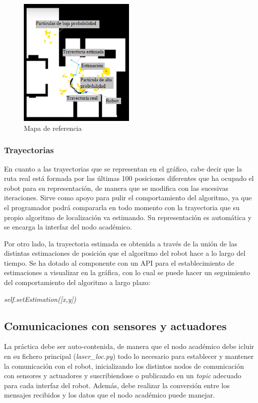 \begin{figure}[H]
	\begin{center}
		\includegraphics[width=0.5\textwidth]{figures/mapareferencia.png}
		\caption{Mapa de referencia}
		\label{fig.mapareferencia}
		\end{center}
\end{figure}

\subsubsection{Trayectorias}
En cuanto a las trayectorias que se representan en el gráfico, cabe decir que la ruta real está formada por las últimas 100 posiciones diferentes que ha ocupado el robot para su representación, de manera que se modifica con las sucesivas iteraciones. Sirve como apoyo para pulir el comportamiento del algoritmo, ya que el programador podrá compararla en todo momento con la trayectoria que su propio algoritmo de localización va estimando. Su representación es automática y se encarga la interfaz del nodo académico.

Por otro lado, la trayectoria estimada es obtenida a través de la unión de las distintas estimaciones de posición que el algoritmo del robot hace a lo largo del tiempo. Se ha dotado al componente con un API para el establecimiento de estimaciones a visualizar en la gráfica, con lo cual se puede hacer un seguimiento del comportamiento del algoritmo a largo plazo:

\hspace{0.32\linewidth} \textit{self.setEstimation([x,y])}
 
\subsection{Comunicaciones con sensores y actuadores}
La práctica debe ser auto-contenida, de manera que el nodo académico debe icluir en su fichero principal (\textit{laser\_loc.py}) todo lo necesario para establecer y mantener la comunicación con el robot, inicializando los distintos nodos de comunicación con sensores y actuadores y suscribiendose o publicando en un \textit{topic} adecuado para cada interfaz del robot. Además, debe realizar la conversión entre los mensajes recibidos y los datos que el nodo académico puede manejar. 

